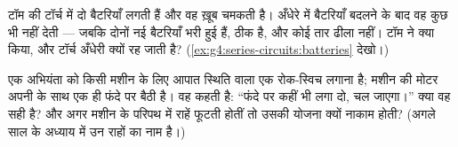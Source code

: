 \begin{exercise}[$\star\star$]\label{exo:g4:series-circuits:10}
टॉम की टॉर्च में दो बैटरियाँ लगती हैं और वह ख़ूब चमकती है। अँधेरे में
बैटरियाँ बदलने के बाद वह कुछ भी नहीं देती --- जबकि दोनों नई बैटरियाँ
भरी हुई हैं,  ठीक है, और कोई तार ढीला नहीं। टॉम ने क्या किया, और
टॉर्च अँधेरी क्यों रह जाती है?
(\cref{ex:g4:series-circuits:batteries} देखो।)
\end{exercise}

\begin{exercise}[$\star\star$]\label{exo:g4:series-circuits:11}
एक अभियंता को किसी मशीन के लिए आपात स्थिति वाला एक रोक-स्विच लगाना
है; मशीन की मोटर अपनी  के साथ एक ही फंदे पर बैठी है। वह कहती है:
``फंदे पर कहीं भी लगा दो, चल जाएगा।'' क्या वह सही है? और अगर मशीन के
परिपथ में राहें फूटती होतीं तो उसकी योजना क्यों नाकाम होती? (अगले साल
के अध्याय में उन राहों का नाम है।)
\end{exercise}
